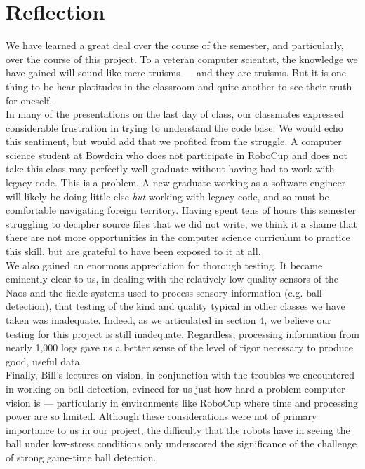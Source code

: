\documentclass[11pt, twocolumn]{article}
\begin{document}
{\section{Reflection}
We have learned a great deal over the course of the semester, and particularly, over the course of this project. To a veteran computer scientist, the knowledge we have gained will sound like mere truisms --- and they are truisms. But it is one thing to be hear platitudes in the classroom and quite another to see their truth for oneself. \\
\indent In many of the presentations on the last day of class, our classmates expressed considerable frustration in trying to understand the code base. We would echo this sentiment, but would add that we profited from the struggle. A computer science student at Bowdoin who does not participate in RoboCup and does not take this class  may perfectly well graduate without having had to work with legacy code. This is a problem. A new graduate working as a software engineer will likely be doing little else \emph{but} working with legacy code, and so must be comfortable navigating foreign territory. Having spent tens of hours this semester struggling to decipher source files that we did not write, we think it a shame that there are not more opportunities in the computer science curriculum to practice this skill, but are grateful to have been exposed to it at all. \\
\indent We also gained an enormous appreciation for thorough testing. It became eminently clear to us, in dealing with the relatively low-quality sensors of the Naos and the fickle systems used to process sensory information (e.g. ball detection), that testing of the kind and quality typical in other classes we have taken was inadequate. Indeed, as we articulated in section 4, we believe our testing for this project is still inadequate. Regardless, processing information from nearly 1,000 logs gave us a better sense of the level of rigor necessary to produce good, useful data. \\
\indent Finally, Bill's lectures on vision, in conjunction with the troubles we encountered in working on ball detection, evinced for us just how hard a problem computer vision is --- particularly in environments like RoboCup where time and processing power are so limited. Although these considerations were not of primary importance to us in our project, the difficulty that the robots have in seeing the ball under low-stress conditions only underscored the significance of the challenge of strong game-time ball detection.

}
\end{document}
